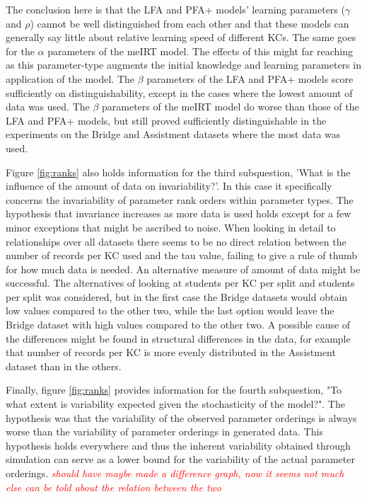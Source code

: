\documentclass{scrartcl}
\newcommand\todo[1]{\textit{\textcolor{red}{#1}}}
\begin{document}
The conclusion here is that the LFA and PFA+ models' learning parameters ($\gamma$ and $\rho$) cannot be well distinguished from each other and that these models can generally say little about relative learning speed of different KCs. The same goes for the $\alpha$ parameters of the meIRT model. The effects of this might far reaching as this parameter-type augments the initial knowledge and learning parameters in application of the model. The $\beta$ parameters of the LFA and PFA+ models score sufficiently on distinguishability, except in the cases where the lowest amount of data was used. The $\beta$ parameters of the meIRT model do worse than those of the LFA and PFA+ models, but still proved sufficiently distinguishable in the experiments on the Bridge and Assistment datasets where the most data was used.  

Figure \ref{fig:ranks} also holds information for the third subquestion, 'What is the influence of the amount of data on invariability?'. In this case it specifically concerns the invariability of parameter rank orders within parameter types. The hypothesis that invariance increases as more data is used holds except for a few minor exceptions that might be ascribed to noise. When looking in detail to relationships over all datasets there seems to be no direct relation between the number of records per KC used and the tau value, failing to give a rule of thumb for how much data is needed. An alternative measure of amount of data might be successful. The alternatives of looking at students per KC per split and students per split was considered, but in the first case the Bridge datasets would obtain low values compared to the other two, while the last option would leave the Bridge dataset with high values compared to the other two. A possible cause of the differences might be found in structural differences in the data, for example that number of records per KC is more evenly distributed in the Assistment dataset than in the others.  

Finally, figure \ref{fig:ranks} provides information for the fourth subquestion, "To what extent is variability expected given the stochasticity of the model?". The hypothesis was that the variability of the observed parameter orderings is always worse than the variability of parameter orderings in generated data. This hypothesis holds everywhere and thus the inherent variability obtained through simulation can serve as a lower bound for the variability of the actual parameter orderings. 
\todo{should have maybe made a difference graph, now it seems not much else can be told about the relation between the two}
\end{document}

